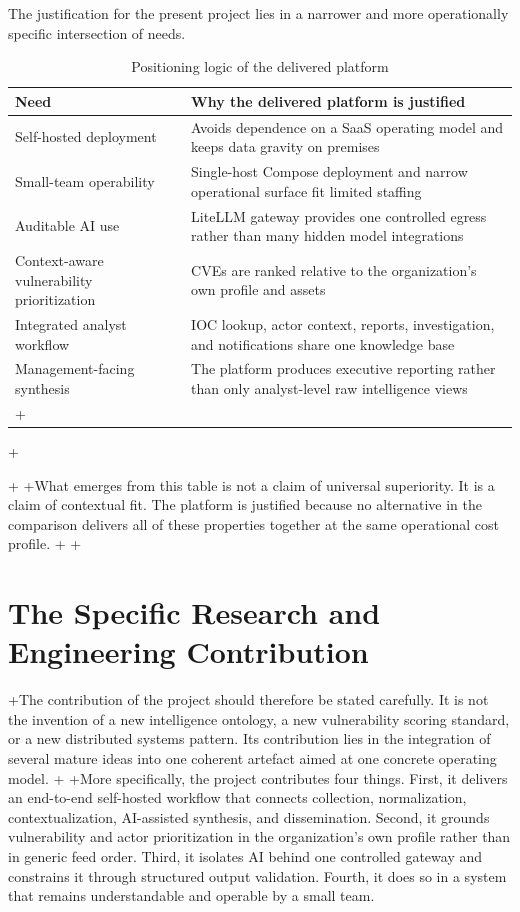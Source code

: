 The justification for the present project lies in a narrower and more operationally specific intersection of needs.

\begin{table}[H]
\centering
\caption{Positioning logic of the delivered platform}
\label{tab:positioning-logic}
\renewcommand{\arraystretch}{1.25}
\begin{tabular}{|p{4.4cm}|p{7.0cm}|}
\hline
\textbf{Need} & \textbf{Why the delivered platform is justified}\\
\hline
Self-hosted deployment & Avoids dependence on a SaaS operating model and keeps data gravity on premises\\
\hline
Small-team operability & Single-host Compose deployment and narrow operational surface fit limited staffing\\
\hline
Auditable AI use & LiteLLM gateway provides one controlled egress rather than many hidden model integrations\\
\hline
Context-aware vulnerability prioritization & CVEs are ranked relative to the organization's own profile and assets\\
\hline
Integrated analyst workflow & IOC lookup, actor context, reports, investigation, and notifications share one knowledge base\\
\hline
Management-facing synthesis & The platform produces executive reporting rather than only analyst-level raw intelligence views\\
\hline
+\end{tabular}
+\end{table}
+
+What emerges from this table is not a claim of universal superiority. It is a claim of contextual fit. The platform is justified because no alternative in the comparison delivers all of these properties together at the same operational cost profile.
+
+\section{The Specific Research and Engineering Contribution}
+The contribution of the project should therefore be stated carefully. It is not the invention of a new intelligence ontology, a new vulnerability scoring standard, or a new distributed systems pattern. Its contribution lies in the integration of several mature ideas into one coherent artefact aimed at one concrete operating model.
+
+More specifically, the project contributes four things. First, it delivers an end-to-end self-hosted workflow that connects collection, normalization, contextualization, AI-assisted synthesis, and dissemination. Second, it grounds vulnerability and actor prioritization in the organization's own profile rather than in generic feed order. Third, it isolates AI behind one controlled gateway and constrains it through structured output validation. Fourth, it does so in a system that remains understandable and operable by a small team.
